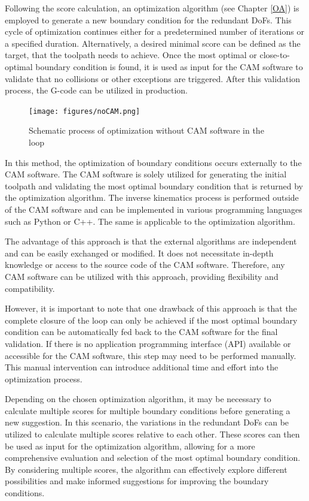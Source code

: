 Following the score calculation, an optimization algorithm (see Chapter \ref{OA}) is employed to generate a new boundary condition for the redundant \acrshort{DoF}s. This cycle of optimization continues either for a predetermined number of iterations or a specified duration. Alternatively, a desired minimal score can be defined as the target, that the toolpath needs to achieve. Once the most optimal or close-to-optimal boundary condition is found, it is used as input for the \acrshort{CAM} software to validate that no collisions or other exceptions are triggered. After this validation process, the G-code can be utilized in production.

\begin{figure}[H]
	\centerline{\texttt{[image: figures/noCAM.png]}}
	\caption{Schematic process of optimization without CAM software in the loop}
	\label{noCAM}
\end{figure}

In this method, the optimization of boundary conditions occurs externally to the \acrshort{CAM} software. The \acrshort{CAM} software is solely utilized for generating the initial toolpath and validating the most optimal boundary condition that is returned by the optimization algorithm. The inverse kinematics process is performed outside of the \acrshort{CAM} software and can be implemented in various programming languages such as Python or C++. The same is applicable to the optimization algorithm.

The advantage of this approach is that the external algorithms are independent and can be easily exchanged or modified. It does not necessitate in-depth knowledge or access to the source code of the \acrshort{CAM} software. Therefore, any \acrshort{CAM} software can be utilized with this approach, providing flexibility and compatibility.    

However, it is important to note that one drawback of this approach is that the complete closure of the loop can only be achieved if the most optimal boundary condition can be automatically fed back to the \acrshort{CAM} software for the final validation. If there is no application programming interface (\acrshort{API}) available or accessible for the \acrshort{CAM} software, this step may need to be performed manually. This manual intervention can introduce additional time and effort into the optimization process.

Depending on the chosen optimization algorithm, it may be necessary to calculate multiple scores for multiple boundary conditions before generating a new suggestion. In this scenario, the variations in the redundant \acrshort{DoF}s can be utilized to calculate multiple scores relative to each other. These scores can then be used as input for the optimization algorithm, allowing for a more comprehensive evaluation and selection of the most optimal boundary condition. By considering multiple scores, the algorithm can effectively explore different possibilities and make informed suggestions for improving the boundary conditions.

